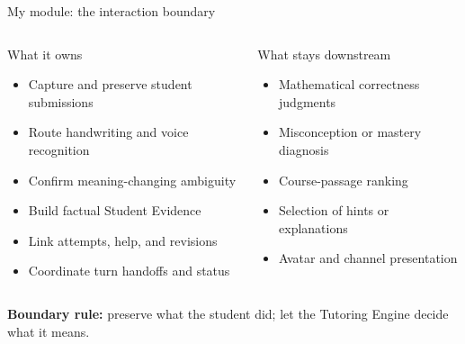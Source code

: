 \documentclass[aspectratio=169,10pt]{beamer}
\begin{document}
\begin{frame}{My module: the interaction boundary}
\begin{columns}[T,onlytextwidth]
\begin{block}{What it owns}
\begin{itemize}
\item Capture and preserve student submissions
\item Route handwriting and voice recognition
\item Confirm meaning-changing ambiguity
\item Build factual Student Evidence
\item Link attempts, help, and revisions
\item Coordinate turn handoffs and status
\end{itemize}
\end{block}
\begin{block}{What stays downstream}
\begin{itemize}
\item Mathematical correctness judgments
\item Misconception or mastery diagnosis
\item Course-passage ranking
\item Selection of hints or explanations
\item Avatar and channel presentation
\end{itemize}
\end{block}
\end{columns}
\vspace{.45em}
\centering
\textbf{Boundary rule:} preserve what the student did; let the Tutoring Engine decide what it means.
\end{frame}
\end{document}
